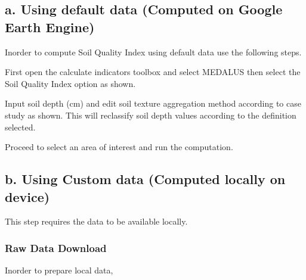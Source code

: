 \documentclass[letterpaper,10pt,english]{sphinxmanual}
\begin{document}
\subsection{a. Using default data (Computed on Google Earth Engine)}
\label{\detokenize{Qgis_Plugin/Calculate_medalus:a-using-default-data-computed-on-google-earth-engine}}
\sphinxAtStartPar
Inorder to compute Soil Quality Index using default data use the following steps.

\sphinxAtStartPar
First open the calculate indicators toolbox and select MEDALUS then select the Soil Quality Index
option as shown.



\sphinxAtStartPar
Input soil depth (cm) and edit soil texture aggregation method according to case study as shown. This
will reclassify soil depth values according to the definition selected.



\sphinxAtStartPar
Proceed to select an area of interest and run the computation.


\subsection{b. Using Custom data (Computed locally on device)}
\label{\detokenize{Qgis_Plugin/Calculate_medalus:b-using-custom-data-computed-locally-on-device}}
\sphinxAtStartPar
This step requires the data to be available locally.


\subsubsection{Raw Data Download}
\label{\detokenize{Qgis_Plugin/Calculate_medalus:raw-data-download}}
\sphinxAtStartPar
Inorder to prepare local data, 
\end{document}
